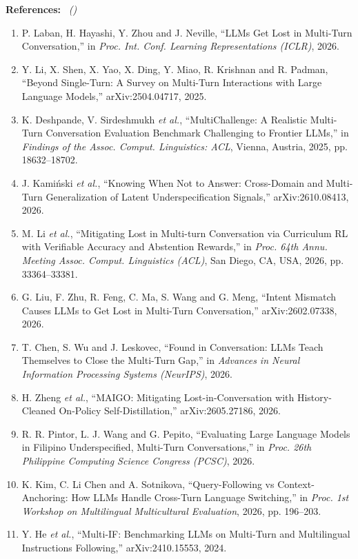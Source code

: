 \documentclass[11pt,a4paper]{article}
\newcommand{\formitem}[3]{%
  \par\vspace{4pt}\noindent\makebox[1.6em][l]{\textbf{#1.}}\textbf{#2}%
  \if\relax\detokenize{#3}\relax\else\ \textit{(#3)}\fi\par}
\begin{document}
\formitem{11}{References:}{}
\begin{enumerate}[label={\arabic*.},leftmargin=2em,itemsep=3pt,topsep=2pt]\small\raggedright
\item P. Laban, H. Hayashi, Y. Zhou and J. Neville, ``LLMs Get Lost in Multi-Turn Conversation,'' in \textit{Proc. Int. Conf. Learning Representations (ICLR)}, 2026.
\item Y. Li, X. Shen, X. Yao, X. Ding, Y. Miao, R. Krishnan and R. Padman, ``Beyond Single-Turn: A Survey on Multi-Turn Interactions with Large Language Models,'' arXiv:2504.04717, 2025.
\item K. Deshpande, V. Sirdeshmukh \textit{et al.}, ``MultiChallenge: A Realistic Multi-Turn Conversation Evaluation Benchmark Challenging to Frontier LLMs,'' in \textit{Findings of the Assoc. Comput. Linguistics: ACL}, Vienna, Austria, 2025, pp. 18632--18702.
\item J. Kami\'nski \textit{et al.}, ``Knowing When Not to Answer: Cross-Domain and Multi-Turn Generalization of Latent Underspecification Signals,'' arXiv:2610.08413, 2026.
\item M. Li \textit{et al.}, ``Mitigating Lost in Multi-turn Conversation via Curriculum RL with Verifiable Accuracy and Abstention Rewards,'' in \textit{Proc. 64th Annu. Meeting Assoc. Comput. Linguistics (ACL)}, San Diego, CA, USA, 2026, pp. 33364--33381.
\item G. Liu, F. Zhu, R. Feng, C. Ma, S. Wang and G. Meng, ``Intent Mismatch Causes LLMs to Get Lost in Multi-Turn Conversation,'' arXiv:2602.07338, 2026.
\item T. Chen, S. Wu and J. Leskovec, ``Found in Conversation: LLMs Teach Themselves to Close the Multi-Turn Gap,'' in \textit{Advances in Neural Information Processing Systems (NeurIPS)}, 2026.
\item H. Zheng \textit{et al.}, ``MAIGO: Mitigating Lost-in-Conversation with History-Cleaned On-Policy Self-Distillation,'' arXiv:2605.27186, 2026.
\item R. R. Pintor, L. J. Wang and G. Pepito, ``Evaluating Large Language Models in Filipino Underspecified, Multi-Turn Conversations,'' in \textit{Proc. 26th Philippine Computing Science Congress (PCSC)}, 2026.
\item K. Kim, C. Li Chen and A. Sotnikova, ``Query-Following vs Context-Anchoring: How LLMs Handle Cross-Turn Language Switching,'' in \textit{Proc. 1st Workshop on Multilingual Multicultural Evaluation}, 2026, pp. 196--203.
\item Y. He \textit{et al.}, ``Multi-IF: Benchmarking LLMs on Multi-Turn and Multilingual Instructions Following,'' arXiv:2410.15553, 2024.

\end{enumerate}
\end{document}
